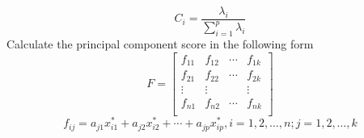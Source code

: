 \documentclass[12pt]{mcmthesis}
\begin{document}
\begin{equation}
C_i=\frac{\lambda_i}{\sum_{i=1}^{p}\lambda_i}
\end{equation}
Calculate the principal component score in the following form
$$F=\left[
      \begin{array}{cccc}
        f_{11} & f_{12} & \cdots&f_{1k} \\
        f_{21} & f_{22} & \cdots& f_{2k}\\
        \vdots&\vdots& &\vdots\\
        f_{n1} & f_{n2} & \cdots&f_{nk} \\
      \end{array}
    \right]
$$
\begin{equation}
f_{ij}=a_{j1}x_{i1}^*+a_{j2}x_{i2}^*+\dotsb+a_{jp}x_{ip}^*,i=1,2,\dotsc,n;j=1,2,\dotsc,k
\end{equation}
\end{document}
